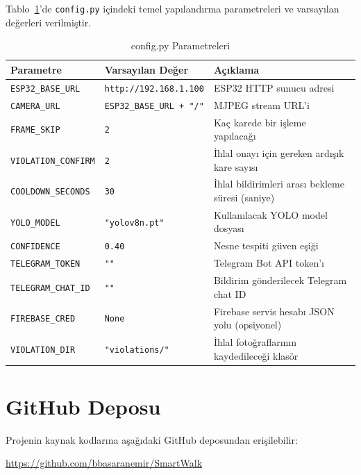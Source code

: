 Tablo~\ref{tbl:konfig}'de \texttt{config.py} içindeki temel yapılandırma parametreleri ve varsayılan değerleri verilmiştir.

\begin{table}[H]
\centering
\caption{config.py Parametreleri}
\label{tbl:konfig}
\begin{tabular}{|l|l|p{6cm}|}
\hline
\textbf{Parametre}       & \textbf{Varsayılan Değer} & \textbf{Açıklama} \\
\hline
\texttt{ESP32\_BASE\_URL}    & \texttt{http://192.168.1.100} & ESP32 HTTP sunucu adresi \\
\hline
\texttt{CAMERA\_URL}         & \texttt{ESP32\_BASE\_URL + "/"} & MJPEG stream URL'i \\
\hline
\texttt{FRAME\_SKIP}         & \texttt{2}               & Kaç karede bir işleme yapılacağı \\
\hline
\texttt{VIOLATION\_CONFIRM}  & \texttt{2}               & İhlal onayı için gereken ardışık kare sayısı \\
\hline
\texttt{COOLDOWN\_SECONDS}   & \texttt{30}              & İhlal bildirimleri arası bekleme süresi (saniye) \\
\hline
\texttt{YOLO\_MODEL}         & \texttt{"yolov8n.pt"}    & Kullanılacak YOLO model dosyası \\
\hline
\texttt{CONFIDENCE}          & \texttt{0.40}            & Nesne tespiti güven eşiği \\
\hline
\texttt{TELEGRAM\_TOKEN}     & \texttt{""}              & Telegram Bot API token'ı \\
\hline
\texttt{TELEGRAM\_CHAT\_ID}  & \texttt{""}              & Bildirim gönderilecek Telegram chat ID \\
\hline
\texttt{FIREBASE\_CRED}      & \texttt{None}            & Firebase servis hesabı JSON yolu (opsiyonel) \\
\hline
\texttt{VIOLATION\_DIR}      & \texttt{"violations/"}   & İhlal fotoğraflarının kaydedileceği klasör \\
\hline
\end{tabular}
\end{table}

\section{GitHub Deposu}
\label{ek:github}

Projenin kaynak kodlarına aşağıdaki GitHub deposundan erişilebilir:

\begin{center}
  \url{https://github.com/bbasaranemir/SmartWalk}
\end{center}


